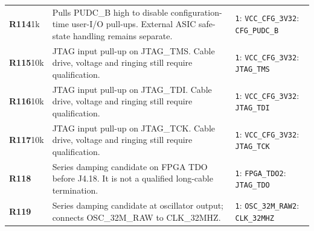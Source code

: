 \documentclass[11pt,a4paper]{article}
\begin{document}
\begin{longtable}{@{}P{27mm}P{84mm}P{57mm}@{}}
\textbf{R114}\newline 1k & Pulls PUDC\_B high to disable configuration-time user-I/O pull-ups. External ASIC safe-state handling remains separate. & \nolinkurl{1}: \nolinkurl{VCC_CFG_3V3}\newline \nolinkurl{2}: \nolinkurl{CFG_PUDC_B} \\
\textbf{R115}\newline 10k & JTAG input pull-up on JTAG\_TMS. Cable drive, voltage and ringing still require qualification. & \nolinkurl{1}: \nolinkurl{VCC_CFG_3V3}\newline \nolinkurl{2}: \nolinkurl{JTAG_TMS} \\
\textbf{R116}\newline 10k & JTAG input pull-up on JTAG\_TDI. Cable drive, voltage and ringing still require qualification. & \nolinkurl{1}: \nolinkurl{VCC_CFG_3V3}\newline \nolinkurl{2}: \nolinkurl{JTAG_TDI} \\
\textbf{R117}\newline 10k & JTAG input pull-up on JTAG\_TCK. Cable drive, voltage and ringing still require qualification. & \nolinkurl{1}: \nolinkurl{VCC_CFG_3V3}\newline \nolinkurl{2}: \nolinkurl{JTAG_TCK} \\
\textbf{R118} & Series damping candidate on FPGA TDO before J4.18. It is not a qualified long-cable termination. & \nolinkurl{1}: \nolinkurl{FPGA_TDO}\newline \nolinkurl{2}: \nolinkurl{JTAG_TDO} \\
\textbf{R119} & Series damping candidate at oscillator output; connects OSC\_32M\_RAW to CLK\_32MHZ. & \nolinkurl{1}: \nolinkurl{OSC_32M_RAW}\newline \nolinkurl{2}: \nolinkurl{CLK_32MHZ} \\

\end{longtable}
\end{document}

